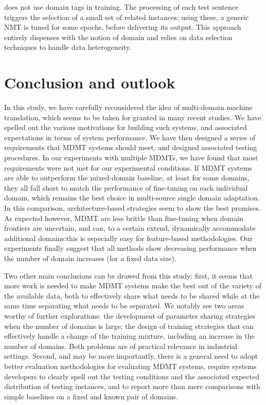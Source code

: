 \documentclass[11pt,a4paper]{article}
\newcommand{\fyTodo}[1]{\Todo[FY:]{\textcolor{orange}{#1}}}
\newcommand{\fyDone}[1]{\done[FY]\Todo[FY:]{\textcolor{orange}{#1}}}
\newcommand{\jcTodo}[1]{\Todo[JC:]{\textcolor{red}{#1}}}
\begin{document}
 does not use domain tags in training. The processing of each test sentence triggers the selection of a small set of related instances; using these, a generic NMT is tuned for some epochs, before delivering its output. This approach entirely dispenses with the notion of domain and relies on data selection techniques to handle data heterogeneity. \jcTodo{cite Xu et al 2019, Lexical Micro-adaptation for Neural Machine Translation}

\section{Conclusion and outlook \label{sec:conclusion}}
\fyDone{Write conclusions}\fyTodo{no mixture of experts}
In this study, we have carefully reconsidered the idea of multi-domain machine translation, which seems to be taken for granted in many recent studies. We have spelled out the various motivations for building such systems, and associated expectations in terms of system performance. We have then designed a series of requirements that MDMT systems should meet, and designed associated testing procedures. In our experiments with multiple MDMTs, we have found that most requirements were not met for our experimental conditions. If MDMT systems are able to outperform the mixed-domain baseline, at least for some domains, they all fall short to match the performance of fine-tuning on each individual domain, which remains the best choice in multi-source single domain adaptation. In this comparison, architecture-based strategies seem to show the best promises. \fyTodo{Mitigate this}
As expected however, MDMT are less brittle than fine-tuning when domain frontiers are uncertain, and can, to a certain extend,
dynamically accommodate additional domains:this is especially easy for feature-based methodologies. Our experiments finally suggest that all methods show decreasing performance when the number of domain increases (for a fixed data size). 

Two other main conclusions can be drawed from this study: first, it seems that more work is needed to make MDMT systems make the best out of the variety of the available data, both to effectively share what needs to be shared while at the same time separating what needs to be separated. We notably see two areas worthy of further explorations: the development of parameter sharing strategies when the number of domains is large; the design of training strategies that can effectively handle a change of the training mixture, including an increase in the number of domains. Both problems are of practical relevance in industrial settings. Second, and may be more importantly, there is a general need to adopt better evaluation methodologies for evaluating MDMT systems, require systems developers to clearly spell out the testing conditions and the associated expected distribution of testing instances, and to report more than mere comparisons with simple baselines on a fixed and known pair of domains.
\end{document}
